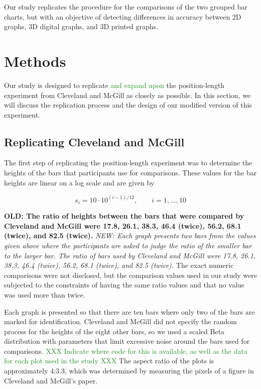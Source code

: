 \documentclass[letterpaper,inpress,dvipsnames]{jdsart}
\begin{document}
Our study replicates the procedure for the comparisons of the two grouped bar charts, but with an objective of detecting differences in accuracy between 2D graphs, 3D digital graphs, and 3D printed graphs.

\hypertarget{methods}{%
\section{Methods}\label{methods}}

Our study is designed to replicate {\textcolor{ForestGreen}{and expand upon}} the position-length experiment from Cleveland and McGill as closely as possible.
In this section, we will discuss the replication process and the design of our modified version of this experiment.

\hypertarget{replicating-cleveland-and-mcgill}{%
\subsection{Replicating Cleveland and McGill}\label{replicating-cleveland-and-mcgill}}

The first step of replicating the position-length experiment was to determine the heights of the bars that participants use for comparisons.
These values for the bar heights are linear on a log scale and are given by

\[s_i=10\cdot 10^{(i-1)/12}, \qquad i=1,...,10\]

\textbf{OLD: The ratio of heights between the bars that were compared by Cleveland and McGill were 17.8, 26.1, 38.3, 46.4 (twice), 56.2, 68.1 (twice), and 82.5 (twice).}
\emph{NEW: Each graph presents two bars from the values given above where the participants are asked to judge the ratio of the smaller bar to the larger bar. The ratio of bars used by Cleveland and McGill were 17.8, 26.1, 38.3, 46.4 (twice), 56.2, 68.1 (twice), and 82.5 (twice).}
The exact numeric comparisons were not disclosed, but the comparison values used in our study were subjected to the constraints of having the same ratio values and that no value was used more than twice.

Each graph is presented so that there are ten bars where only two of the bars are marked for identification.
Cleveland and McGill did not specify the random process for the heights of the eight other bars, so we used a scaled Beta distribution with parameters that limit excessive noise around the bars used for comparisons. {\textcolor{ForestGreen}{XXX Indicate where code for this is available, as well as the data for each plot used in the study XXX}}
The aspect ratio of the plots is approximately 4:3.3, which was determined by measuring the pixels of a figure in Cleveland and McGill's paper.
\end{document}
